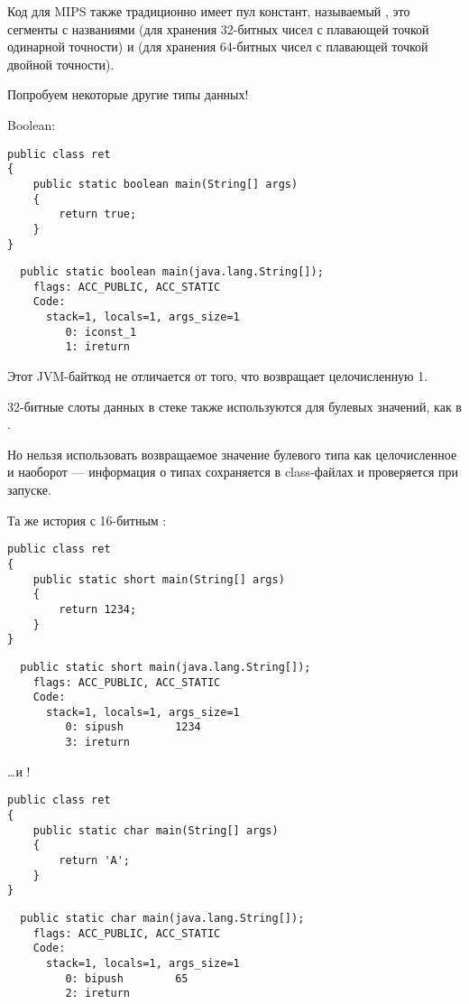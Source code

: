 Код для MIPS также традиционно имеет пул констант, называемый , это сегменты
с названиями  (для хранения 32-битных чисел с плавающей точкой одинарной точности) и
(для хранения 64-битных чисел с плавающей точкой двойной точности).

Попробуем некоторые другие типы данных!

Boolean:

\begin{lstlisting}
public class ret
{
	public static boolean main(String[] args) 
	{
		return true;
	}
}
\end{lstlisting}

\begin{lstlisting}
  public static boolean main(java.lang.String[]);
    flags: ACC_PUBLIC, ACC_STATIC
    Code:
      stack=1, locals=1, args_size=1
         0: iconst_1      
         1: ireturn       
\end{lstlisting}

Этот JVM-байткод не отличается от того, что возвращает целочисленную 1.

32-битные слоты данных в стеке также используются для булевых значений, как в \CCpp.

Но нельзя использовать возвращаемое значение булевого типа как целочисленное и наоборот --- информация 
о типах сохраняется в class-файлах и проверяется при запуске.

Та же история с 16-битным :

\begin{lstlisting}
public class ret
{
	public static short main(String[] args) 
	{
		return 1234;
	}
}
\end{lstlisting}

\begin{lstlisting}
  public static short main(java.lang.String[]);
    flags: ACC_PUBLIC, ACC_STATIC
    Code:
      stack=1, locals=1, args_size=1
         0: sipush        1234
         3: ireturn       
\end{lstlisting}

\dots и !

\begin{lstlisting}
public class ret
{
	public static char main(String[] args) 
	{
		return 'A';
	}
}
\end{lstlisting}

\begin{lstlisting}
  public static char main(java.lang.String[]);
    flags: ACC_PUBLIC, ACC_STATIC
    Code:
      stack=1, locals=1, args_size=1
         0: bipush        65
         2: ireturn       
\end{lstlisting}

